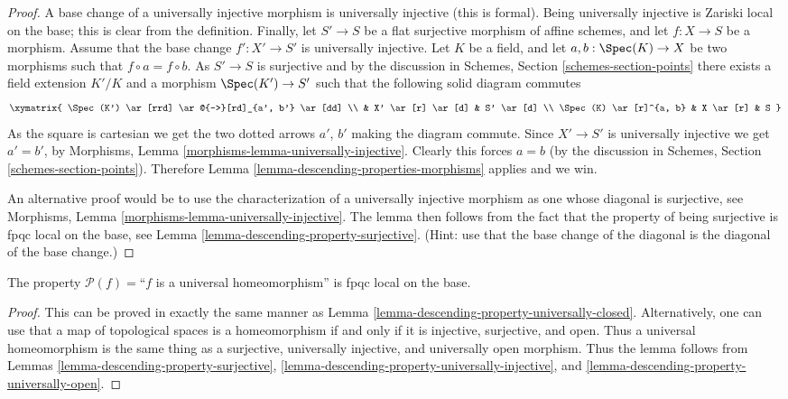 \begin{proof}
A base change of a universally injective morphism is universally
injective (this is formal). Being universally injective is Zariski
local on the base; this is clear from the definition.
Finally, let
$S' \to S$ be a flat surjective morphism of affine schemes,
and let $f : X \to S$ be a morphism. Assume that the base change
$f' : X' \to S'$ is universally injective. Let $K$ be a field, and let
$a, b : \Spec(K) \to X$ be two morphisms such that
$f \circ a = f \circ b$. As $S' \to S$ is surjective and
by the discussion in Schemes,
Section \ref{schemes-section-points} there exists a field
extension $K'/K$ and a morphism $\Spec(K')
\to S'$ such that the following solid diagram commutes
$$
\xymatrix{
\Spec(K') \ar[rrd] \ar@{-->}[rd]_{a', b'} \ar[dd] \\
 &
X' \ar[r] \ar[d] &
S' \ar[d] \\
\Spec(K) \ar[r]^{a, b} &
X \ar[r] &
S
}
$$
As the square is cartesian we get the two dotted arrows $a'$, $b'$ making the
diagram commute. Since $X' \to S'$ is universally injective we get $a' = b'$,
by
Morphisms, Lemma \ref{morphisms-lemma-universally-injective}.
Clearly this forces $a = b$ (by the discussion in Schemes,
Section \ref{schemes-section-points}).
Therefore Lemma \ref{lemma-descending-properties-morphisms} applies and we win.

\medskip\noindent
An alternative proof would be to use the characterization of a universally
injective morphism as one whose diagonal is surjective, see
Morphisms, Lemma \ref{morphisms-lemma-universally-injective}.
The lemma then follows from the fact that
the property of being surjective is fpqc local on the base, see
Lemma \ref{lemma-descending-property-surjective}.
(Hint: use that the base change of the diagonal is the diagonal
of the base change.)
\end{proof}

\begin{lemma}
\label{lemma-descending-property-universal-homeomorphism}
The property $\mathcal{P}(f) =$``$f$ is a universal homeomorphism''
is fpqc local on the base.
\end{lemma}

\begin{proof}
This can be proved in exactly the same manner as
Lemma \ref{lemma-descending-property-universally-closed}.
Alternatively, one can use that
a map of topological spaces is a homeomorphism if and only if
it is injective, surjective, and open. Thus
a universal homeomorphism is the same thing as a
surjective, universally injective, and universally open morphism.
Thus the lemma follows from
Lemmas \ref{lemma-descending-property-surjective},
\ref{lemma-descending-property-universally-injective}, and
\ref{lemma-descending-property-universally-open}.
\end{proof}

